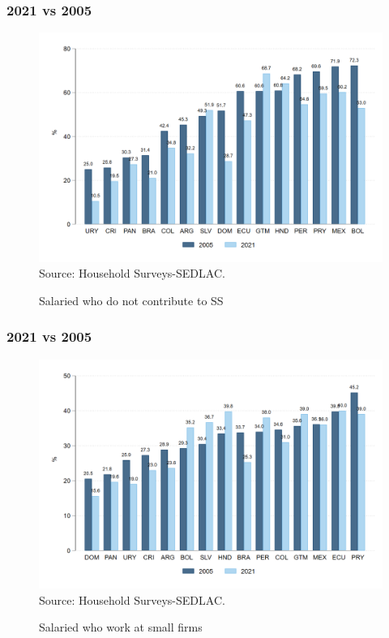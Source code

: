 \documentclass{beamer}
\begin{document}
\begin{frame}
\frametitle{2021 vs 2005}
\begin{figure}[!htb]
    \justifying
     \caption{Salaried who do not contribute to SS}     
       \includegraphics[width=0.8\linewidth]
       {latex/figures/Snapshot/snapshot_informal_ss_dep.png}
    \label{fig:SalariedSS}
    \centering
    \footnotesize{Source: Household Surveys-SEDLAC.}
\end{figure}


    
\end{frame}


\begin{frame}
\frametitle{2021 vs 2005}
\begin{figure}[!htb]
    \justifying
     \caption{Salaried who work at small firms}     
     \includegraphics[width=0.8\linewidth]{latex/figures/Snapshot/snapshot_dependents_small.png}
    \label{fig:SalariedSmall}
    \centering
    \footnotesize{Source: Household Surveys-SEDLAC.}
\end{figure}
\end{frame}
\end{document}
